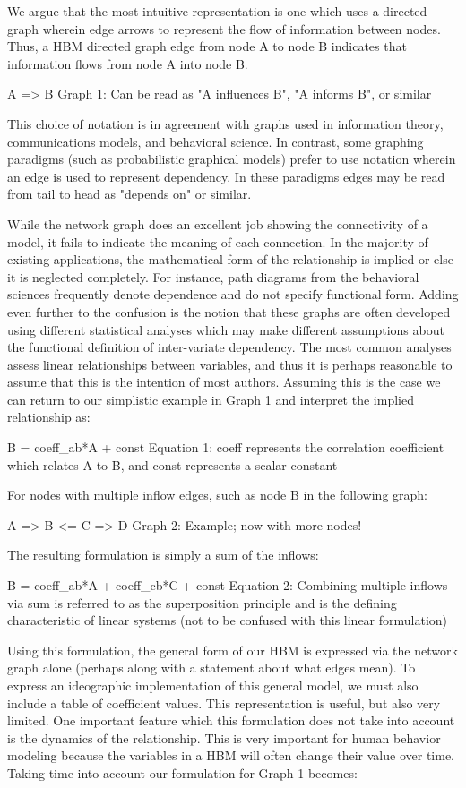 We argue that the most intuitive representation is one which uses a directed graph wherein edge arrows to represent the flow of information between nodes.
Thus, a HBM  directed graph edge from node A to node B indicates that information flows from node A into node B. 

A => B
Graph 1: Can be read as "A influences B", "A informs B", or similar

This choice of notation is in agreement with graphs used in information theory, communications models, and behavioral science.
In contrast, some graphing paradigms (such as probabilistic graphical models) prefer to use notation wherein an edge is used to represent dependency.
In these paradigms edges may be read from tail to head as "depends on" or similar.

While the network graph does an excellent job showing the connectivity of a model, it fails to indicate the meaning of each connection.
In the majority of existing applications, the mathematical form of the relationship is implied or else it is neglected completely.
For instance, path diagrams from the behavioral sciences frequently denote dependence and do not specify functional form.
Adding even further to the confusion is the notion that these graphs are often developed using different statistical analyses which may make different assumptions about the functional definition of inter-variate dependency.
The most common analyses assess linear relationships between variables, and thus it is perhaps reasonable to assume that this is the intention of most authors.
Assuming this is the case we can return to our simplistic example in Graph 1 and interpret the implied relationship as:

B = coeff_ab*A + const
Equation 1: coeff represents the correlation coefficient which relates A to B, 
and const represents a scalar constant

For nodes with multiple inflow edges, such as node B in the following graph:

A => B <= C => D
Graph 2: Example; now with more nodes!

The resulting formulation is simply a sum of the inflows:

B = coeff_ab*A + coeff_cb*C + const
Equation 2: Combining multiple inflows via sum is referred to as the superposition principle and is the defining characteristic of linear systems (not to be confused with this linear formulation)

Using this formulation, the general form of our HBM is expressed via the network graph alone (perhaps along with a statement about what edges mean).
To express an ideographic implementation of this general model, we must also include a table of coefficient values. This representation is useful, but also very limited.
One important feature which this formulation does not take into account is the dynamics of the relationship.
This is very important for human behavior modeling because the variables in a HBM will often change their value over time.
Taking time into account our formulation for Graph 1 becomes:

